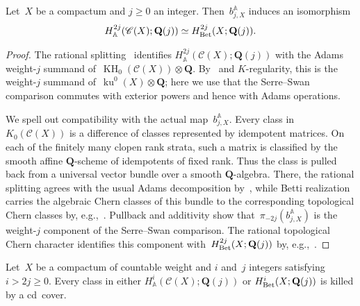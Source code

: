 \documentclass[11pt,a4paper]{amsart}
\newcommand{\cref}[1]{\zcref{#1}}
\numberwithin{equation}{section}
\theoremstyle{plain}
\theoremstyle{definition}
\theoremstyle{remark}
\newcommand{\QQ}{\mathbf{Q}}
\newcommand{\AA}{\mathbb{A}}
\newcommand{\Bet}{\textnormal{Bet}}
\newcommand{\KH}{\operatorname{KH}}
\newcommand{\ku}{\operatorname{ku}}
\newcommand{\Cls}[1]{\mathscr{#1}}
\begin{document}
\begin{lemma}\label{rational-edge}
  Let~\(X\) be a compactum and \(j\geq0\) an integer.
  Then~\(b^{\AA}_{j,X}\) induces an isomorphism
  \begin{equation*}
    H^{2j}_{\AA}(\Cls{C}(X);\QQ(j))
    \simeq
    H^{2j}_{\Bet}(X;\QQ(j)).
  \end{equation*}
\end{lemma}

\begin{proof}
  The rational splitting~\cref{e:splitting}
  identifies
  \(
    H^{2j}_{\AA}(\Cls{C}(X);\QQ(j))
  \)
  with the Adams weight-\(j\) summand
  of~\(\KH_0(\Cls{C}(X))\otimes\QQ\).
  By~\cref{xhar7u}
  and \(K\)-regularity,
  this is the weight-\(j\) summand
  of~\(\ku^0(X)\otimes\QQ\);
  here we use that
  the Serre–Swan comparison commutes
  with exterior powers
  and hence with Adams operations.

  We spell out compatibility
  with the actual map~\(b^{\AA}_{j,X}\).
  Every class in~\(K_0(\Cls{C}(X))\)
  is a difference of classes represented by idempotent matrices.
  On each of the finitely many clopen rank strata,
  such a matrix is classified
  by the smooth affine \(\QQ\)-scheme
  of idempotents of fixed rank.
  Thus the class is pulled back
  from a universal vector bundle
  over a smooth \(\QQ\)-algebra.
  There, the rational splitting agrees
  with the usual Adams decomposition
  by~\cite[Theorem~4.47\,(4)]{BachmannElmantoMorrow},
  while Betti realization carries the algebraic Chern classes
  of this bundle to the corresponding topological Chern classes
  by, e.g.,~\cite[Theorems~27 and~28]{FriedlanderWalker05}.
  Pullback and additivity show
  that~\(\pi_{-2j}(b^{\AA}_{j,X})\)
  is the weight-\(j\) component
  of the Serre–Swan comparison.
  The rational topological Chern character identifies this component
  with~\(H^{2j}_{\Bet}(X;\QQ(j))\)
  by, e.g.,~\cite[Theorems~V.3.25 and~V.3.27]{Karoubi78}.
\end{proof}

\begin{lemma}\label{rational-triv}
  Let~\(X\) be a compactum of countable weight
  and
  \(i\) and~\(j\) integers
  satisfying \(i>2j\geq0\).
  Every class in either
  \(H^i_{\AA}(\Cls{C}(X);\QQ(j))\)
  or \(H^i_{\Bet}(X;\QQ(j))\)
  is killed by a cd~cover.
\end{lemma}
\end{document}
